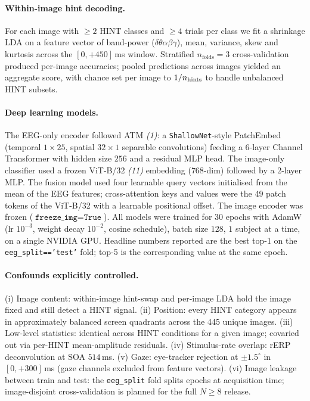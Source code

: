 \documentclass[12pt]{article}
\begin{document}
\paragraph*{Within-image hint decoding.}
For each image with $\geq 2$ HINT classes and $\geq 4$ trials per
class we fit a shrinkage LDA on a feature vector of band-power
($\delta\theta\alpha\beta\gamma$), mean, variance, skew and kurtosis
across the $[0,+450]$\,ms window.  Stratified
$n_{\mbox{folds}}=3$ cross-validation produced per-image accuracies;
pooled predictions across images yielded an aggregate score, with
chance set per image to $1/n_{\rm hints}$ to handle
unbalanced HINT subsets.

\paragraph*{Deep learning models.}
The EEG-only encoder followed ATM \textit{(1)}: a
\texttt{ShallowNet}-style PatchEmbed (temporal $1\times25$,
spatial $32\times1$ separable convolutions) feeding a
6-layer Channel Transformer with hidden size $256$ and a residual
MLP head.  The image-only classifier used a frozen ViT-B/32
\textit{(11)} embedding ($768$-dim) followed by a 2-layer MLP.
The fusion model used four learnable query vectors initialised
from the mean of the EEG features; cross-attention keys and
values were the 49 patch tokens of the ViT-B/32 with a learnable
positional offset.  The image encoder was frozen ($\texttt{freeze\_img}
=\texttt{True}$).  All models were trained for $30$ epochs with
AdamW (lr $10^{-3}$, weight decay $10^{-2}$, cosine schedule),
batch size $128$, $1$ subject at a time, on a single
NVIDIA GPU.  Headline numbers reported are the best top-1 on the
\texttt{eeg\_split=='test'} fold; top-5 is the corresponding value
at the same epoch.

\paragraph*{Confounds explicitly controlled.}
(i) Image content: within-image hint-swap and per-image LDA
hold the image fixed and still detect a HINT signal.
(ii) Position: every HINT category appears in approximately
balanced screen quadrants across the 445 unique images.
(iii) Low-level statistics: identical across HINT conditions for a
given image; covaried out via per-HINT mean-amplitude residuals.
(iv) Stimulus-rate overlap: rERP deconvolution at SOA $514$\,ms.
(v) Gaze: eye-tracker rejection at $\pm 1.5^\circ$ in
$[0,+300]$\,ms (gaze channels excluded from feature vectors).
(vi) Image leakage between train and test: the
\texttt{eeg\_split} fold splits epochs at acquisition time;
image-disjoint cross-validation is planned for the full
$N\geq8$ release.
\end{document}
